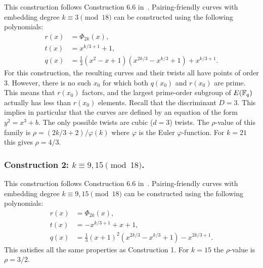 This construction follows {Construction 6.6} in~\cite{2010/freeman}.
Pairing-friendly curves with embedding degree $k \equiv 3 \pmod{18}$
can be constructed using the following polynomials:
\begin{align*}
r(x) &= \Phi_{2k}(x),	\\
t(x) &= x^{k/3+1} + 1,	\\
q(x) &= \frac{1}{3} (x^2 - x + 1) (x^{2k/3} - x^{k/3} + 1) + x^{k/3+1}.
\end{align*}
For this construction,
the resulting curves and their twists all have points of order 3.
However, there is no such $x_0$ for which
both $q(x_0)$ and $r(x_0)$ are prime.
This means that $r(x_0)$ factors, and the largest prime-order subgroup of $E(\mathbb{F}_{q})$ actually has less than $r(x_0)$ elements.
Recall that the discriminant $D = 3$. 
This implies in particular that the curves are defined by an equation of the form $y^2 = x^3 + b$.
The only possible twists are cubic ($d=3$) twists.
The $\rho$-value of this family is $\rho = (2k/3 + 2)/\varphi(k)$ where $\varphi$ is the Euler $\varphi$-function.
For $k = 21$ this gives $\rho = 4/3$.


\subsubsection{Construction 2: $k \equiv 9,15 \pmod{18}$.}
\label{con2}

This construction follows {Construction 6.6} in~\cite{2010/freeman}.
Pairing-friendly curves with embedding degree $k \equiv 9,15 \pmod{18}$
can be constructed using the following polynomials:
\begin{align*}
r(x) &= \Phi_{2k}(x),	\\
t(x) &= -x^{k/3+1} + x + 1,	\\
q(x) &= \frac{1}{3} (x+1)^2 (x^{2k/3} - x^{k/3} + 1) - x^{2k/3+1}.
\end{align*}
This satisfies all the same properties as Construction 1.
For $k=15$ the $\rho$-value is $\rho=3/2$.

